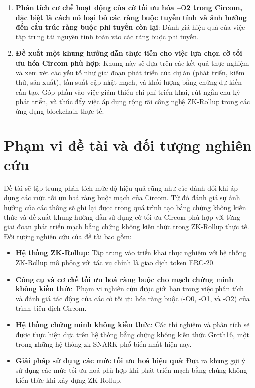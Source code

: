 \begin{enumerate}
    \item \textbf{Phân tích cơ chế hoạt động của cờ tối ưu hóa --O2 trong Circom, đặc biệt là cách nó loại bỏ các ràng buộc tuyến tính và ảnh hưởng đến cấu trúc ràng buộc phi tuyến còn lại}: Đánh giá hiệu quả của việc tập trung tài nguyên tính toán vào các ràng buộc phi tuyến.

    \item \textbf{Đề xuất một khung hướng dẫn thực tiễn cho việc lựa chọn cờ tối ưu hóa Circom phù hợp}:  Khung này sẽ dựa trên các kết quả thực nghiệm và xem xét các yếu tố như giai đoạn phát triển của dự án (phát triển, kiểm thử, sản xuất), tần suất cập nhật mạch, và khối lượng bằng chứng dự kiến cần tạo. Góp phần vào việc giảm thiểu chi phí triển khai, rút ngắn chu kỳ phát triển, và thúc đẩy việc áp dụng rộng rãi công nghệ ZK-Rollup trong các ứng dụng blockchain thực tế.
\end{enumerate}
\section{Phạm vi đề tài và đối tượng nghiên cứu}
Đề tài sẽ tập trung phân tích mức độ hiệu quả cũng như các đánh đổi khi áp dụng các mức tối ưu hoá ràng buộc mạch của Circom. Từ đó đánh giá sự ảnh hưởng của các thông số ghi lại được trong quá trình tạo bằng chứng không kiến thức và đề xuất khung hướng dẫn sử dụng cờ tối ưu Circom phù hợp với từng giai đoạn phát triển mạch bằng chứng không kiến thức trong ZK-Rollup thực tế.
Đối tượng nghiên cứu của đề tài bao gồm:

\begin{itemize}
    \item \textbf{Hệ thống ZK-Rollup}: Tập trung vào triển khai thực nghiệm với hệ thống ZK-Rollup mô phỏng với tác vụ chính là giao dịch token ERC-20.
    \item \textbf{Công cụ và cơ chế tối ưu hoá ràng buộc cho mạch chứng minh không kiến thức}: Phạm vi nghiên cứu được giới hạn trong việc phân tích và đánh giá tác động của các cờ tối ưu hóa ràng buộc (-O0, -O1, và -O2) của trình biên dịch Circom.
    \item \textbf{Hệ thống chứng minh không kiến thức}: Các thí nghiệm và phân tích sẽ được thực hiện dựa trên hệ thống bằng chứng không kiến thức Groth16, một trong những hệ thống zk-SNARK phổ biến nhất hiện nay.
    \item \textbf{Giải pháp sử dụng các mức tối ưu hoá hiệu quả}: Đưa ra khung gợi ý sử dụng các mức tối ưu hoá phù hợp khi phát triển mạch bằng chứng không kiến thức khi xây dựng ZK-Rollup.
\end{itemize}

